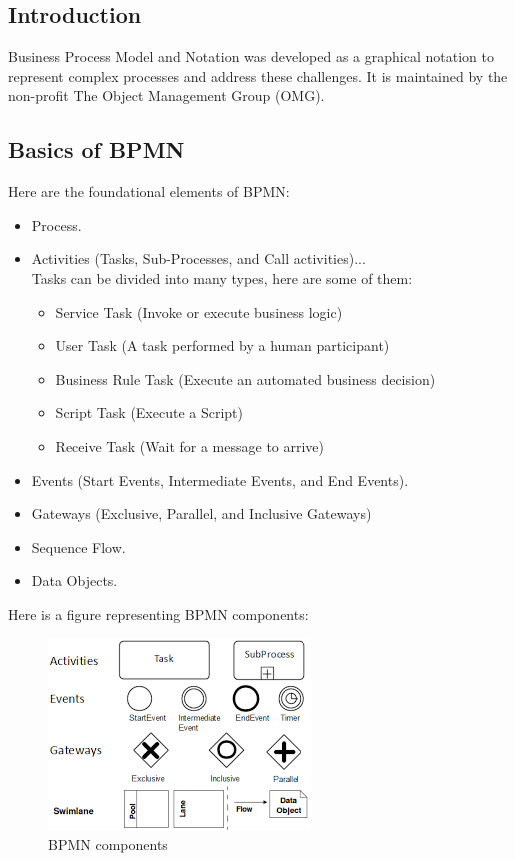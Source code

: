 \documentclass[12pt]{article}
\begin{document}
{  \subsection{Introduction}

  Business Process Model and Notation was developed as a graphical notation to represent complex processes and address these challenges. It is maintained by the non-profit The Object Management Group (OMG).

  \subsection{Basics of BPMN}

  Here are the foundational elements of BPMN:

  \begin{itemize}
    \item Process.
    \item Activities (Tasks, Sub-Processes, and Call activities)...\\
      Tasks can be divided into many types, here are some of them:
      \begin{itemize}
        \item Service Task (Invoke or execute business logic)
        \item User Task (A task performed by a human participant)
        \item Business Rule Task (Execute an automated business decision)
        \item Script Task (Execute a Script)
        \item Receive Task (Wait for a message to arrive)
      \end{itemize}

    \item Events (Start Events, Intermediate Events, and End Events).
    \item Gateways (Exclusive, Parallel, and Inclusive Gateways)
    \item Sequence Flow.
    \item Data Objects.
  \end{itemize}


  \pagebreak

  Here is a figure representing BPMN components:

  \begin{figure}[h]
    \centering
    \includegraphics[width=.35\linewidth]{bpmn.png}
    \caption{BPMN components}
    \label{fig:bpmn}
  \end{figure}

}
\end{document}
